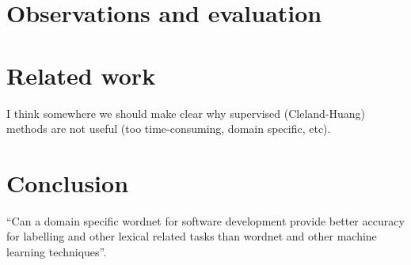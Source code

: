 \documentclass[times, 10pt,twocolumn]{article}
\begin{document}
\section{Observations and evaluation}

\section{Related work}
I think somewhere we should make clear why supervised
(Cleland-Huang) methods are not useful (too time-consuming, domain
specific, etc).

\section{Conclusion}
``Can a domain specific wordnet for
   software development provide better accuracy for labelling and other
   lexical related tasks than wordnet and other machine learning
   techniques''.




\end{document}
